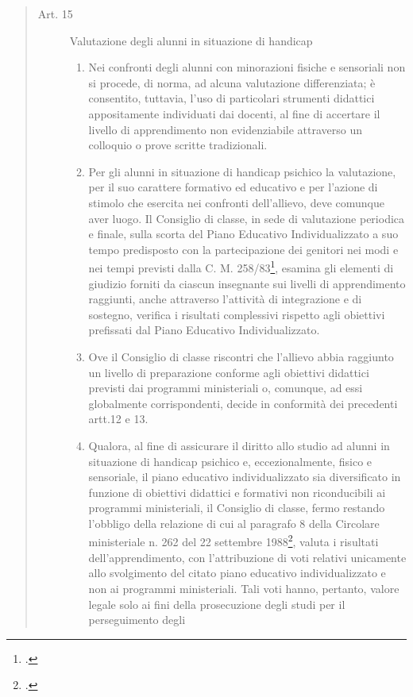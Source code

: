 	\begin{quote}
		\begin{description}
			\item[Art. 15] 	Valutazione degli alunni in situazione di handicap
			\begin{enumerate}
				\item Nei confronti degli alunni con minorazioni fisiche e sensoriali non si procede, di norma, ad alcuna
				valutazione differenziata; è consentito, tuttavia, l'uso di particolari strumenti didattici
				appositamente individuati dai docenti, al fine di accertare il livello di apprendimento non
				evidenziabile attraverso un colloquio o prove scritte tradizionali.
				\item Per gli alunni in situazione di handicap psichico la valutazione, per il suo carattere formativo ed
				educativo e per l'azione di stimolo che esercita nei confronti dell'allievo, deve comunque aver
				luogo. Il Consiglio di classe, in sede di valutazione periodica e finale, sulla scorta del Piano
				Educativo Individualizzato a suo tempo predisposto con la partecipazione dei genitori nei modi e
				nei tempi previsti dalla C. M. 258/83\footcite{CM_258_1983}, esamina gli elementi di giudizio forniti da ciascun insegnante
				sui livelli di apprendimento raggiunti, anche attraverso l'attività di integrazione e di sostegno,
				verifica i risultati complessivi rispetto agli obiettivi prefissati dal Piano Educativo
				Individualizzato.
				\item Ove il Consiglio di classe riscontri che l'allievo abbia raggiunto un livello di preparazione conforme
				agli obiettivi didattici previsti dai programmi ministeriali o, comunque, ad essi globalmente
				corrispondenti, decide in conformità dei precedenti artt.12 e 13.
				\item Qualora, al fine di assicurare il diritto allo studio ad alunni in situazione di handicap psichico e,
				eccezionalmente, fisico e sensoriale, il piano educativo individualizzato sia diversificato in funzione
				di obiettivi didattici e formativi non riconducibili ai programmi ministeriali, il Consiglio di classe,
				fermo restando l'obbligo della relazione di cui al paragrafo 8 della Circolare ministeriale n. 262 del
				22 settembre 1988\footcite{cm_262_1988}, valuta i risultati dell'apprendimento, con l'attribuzione di voti relativi unicamente
				allo svolgimento del citato piano educativo individualizzato e non ai programmi ministeriali. Tali voti
				hanno, pertanto, valore legale solo ai fini della prosecuzione degli studi per il perseguimento degli

\end{enumerate}
\end{description}
\end{quote}
